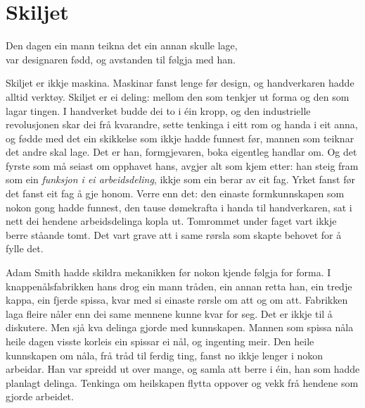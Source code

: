 \chapter{Skiljet}

\begin{motto}
Den dagen ein mann teikna det ein annan skulle lage,\\ var designaren fødd, og avstanden til følgja med han.
\end{motto}

Skiljet er ikkje maskina. Maskinar fanst lenge før design, og handverkaren hadde alltid verktøy. Skiljet er ei deling: mellom den som tenkjer ut forma og den som lagar tingen. I handverket budde dei to i éin kropp, og den industrielle revolusjonen skar dei frå kvarandre, sette tenkinga i eitt rom og handa i eit anna, og fødde med det ein skikkelse som ikkje hadde funnest før, mannen som teiknar det andre skal lage. Det er han, formgjevaren, boka eigentleg handlar om. Og det fyrste som må seiast om opphavet hans, avgjer alt som kjem etter: han steig fram som ein \emph{funksjon i ei arbeidsdeling}, ikkje som ein berar av eit fag. Yrket fanst før det fanst eit fag å gje honom. Verre enn det: den einaste formkunnskapen som nokon gong hadde funnest, den tause dømekrafta i handa til handverkaren, sat i nett dei hendene arbeidsdelinga kopla ut. Tomrommet under faget vart ikkje berre ståande tomt. Det vart grave att i same rørsla som skapte behovet for å fylle det.

Adam Smith hadde skildra mekanikken før nokon kjende følgja for forma. I knappenålsfabrikken hans drog ein mann tråden, ein annan retta han, ein tredje kappa, ein fjerde spissa, kvar med si einaste rørsle om att og om att. Fabrikken laga fleire nåler enn dei same mennene kunne kvar for seg. Det er ikkje til å diskutere. Men sjå kva delinga gjorde med kunnskapen. Mannen som spissa nåla heile dagen visste korleis ein spissar ei nål, og ingenting meir. Den heile kunnskapen om nåla, frå tråd til ferdig ting, fanst no ikkje lenger i nokon arbeidar. Han var spreidd ut over mange, og samla att berre i éin, han som hadde planlagt delinga. Tenkinga om heilskapen flytta oppover og vekk frå hendene som gjorde arbeidet.



